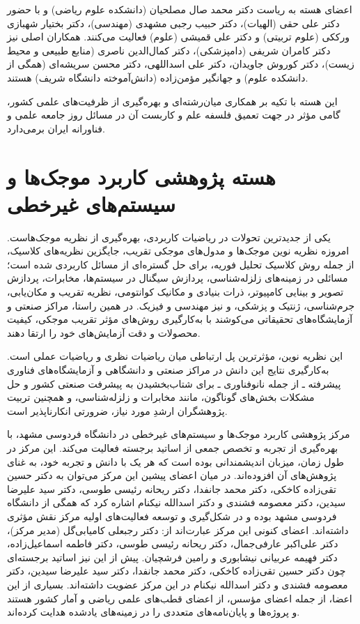 \documentclass[
  letterpaper,
  DIV=11,
  numbers=noendperiod]{scrreprt}
\begin{document}
اعضای هسته به ریاست دکتر محمد صال مصلحیان (دانشکده علوم ریاضی) و با حضور
دکتر علی حقی (الهیات)، دکتر حبیب رجبی مشهدی (مهندسی)، دکتر بختیار شهبازی
ورککی (علوم تربیتی) و دکتر علی قمیشی (علوم) فعالیت می‌کنند. همکاران اصلی
نیز دکتر کامران شریفی (دامپزشکی)، دکتر کمال‌الدین ناصری (منابع طبیعی و
محیط زیست)، دکتر کوروش جاویدان، دکتر علی اسداللهی، دکتر محسن سریشه‌ای
(همگی از دانشکده علوم) و جهانگیر مؤمن‌زاده (دانش‌آموخته دانشگاه شریف)
هستند.

این هسته با تکیه بر همکاری میان‌رشته‌ای و بهره‌گیری از ظرفیت‌های علمی کشور،
گامی مؤثر در جهت تعمیق فلسفه علم و کاربست آن در مسائل روز جامعه علمی و
فناورانه ایران برمی‌دارد.

\section{هسته پژوهشی کاربرد موجک‌ها و سیستم‌های
غیرخطی}\label{ux647ux633ux62aux647-ux67eux698ux648ux647ux634ux6cc-ux6a9ux627ux631ux628ux631ux62f-ux645ux648ux62cux6a9ux647ux627-ux648-ux633ux6ccux633ux62aux645ux647ux627ux6cc-ux63aux6ccux631ux62eux637ux6cc}

یکی از جدیدترین تحولات در ریاضیات کاربردی، بهره‌گیری از نظریه موجک‌هاست.
امروزه نظریه نوین موجک‌ها و مدول‌های موجکی تقریب، جایگزین نظریه‌های کلاسیک،
از جمله روش کلاسیک تحلیل فوریه، برای حل گستره‌ای از مسائل کاربردی شده
است؛ مسائلی در زمینه‌های زلزله‌شناسی، پردازش سیگنال در سیستم‌ها، مخابرات،
پردازش تصویر و بینایی کامپیوتر، ذرات بنیادی و مکانیک کوانتومی، نظریه
تقریب و مکان‌یابی، جرم‌شناسی، ژنتیک و پزشکی، و نیز مهندسی و فیزیک. در همین
راستا، مراکز صنعتی و آزمایشگاه‌های تحقیقاتی می‌کوشند با به‌کارگیری روش‌های
مؤثر تقریب موجکی، کیفیت محصولات و دقت آزمایش‌های خود را ارتقا دهند.

این نظریه نوین، مؤثرترین پل ارتباطی میان ریاضیات نظری و ریاضیات عملی
است. به‌کارگیری نتایج این دانش در مراکز صنعتی و دانشگاهی و آزمایشگاه‌های
فناوری پیشرفته ـ از جمله نانوفناوری ـ برای شتاب‌بخشیدن به پیشرفت صنعتی
کشور و حل مشکلات بخش‌های گوناگون، مانند مخابرات و زلزله‌شناسی، و همچنین
تربیت پژوهشگران ارشدِ مورد نیاز، ضرورتی انکارناپذیر است.

مرکز پژوهشی کاربرد موجک‌ها و سیستم‌های غیرخطی در دانشگاه فردوسی مشهد، با
بهره‌گیری از تجربه و تخصص جمعی از اساتید برجسته فعالیت می‌کند. این مرکز در
طول زمان، میزبان اندیشمندانی بوده است که هر یک با دانش و تجربه خود، به
غنای پژوهش‌های آن افزوده‌اند. در میان اعضای پیشین این مرکز می‌توان به دکتر
حسین تقی‌زاده کاخکی، دکتر محمد جانفدا، دکتر ریحانه رئیسی طوسی، دکتر سید
علیرضا سیدین، دکتر معصومه فشندی و دکتر اسدالله نیکنام اشاره کرد که همگی
از دانشگاه فردوسی مشهد بوده و در شکل‌گیری و توسعه فعالیت‌های اولیه مرکز
نقش مؤثری داشته‌اند. اعضای کنونی این مرکز عبارت‌اند از: دکتر رجبعلی
کامیابی‌گل (مدیر مرکز)، دکتر علی‌اکبر عارفی‌جمال، دکتر ریحانه رئیسی طوسی،
دکتر فاطمه اسماعیل‌زاده، دکتر فهیمه عربیانی نیشابوری و رامین فرشچیان. پیش
از این نیز اساتید برجسته‌ای چون دکتر حسین تقی‌زاده کاخکی، دکتر محمد
جانفدا، دکتر سید علیرضا سیدین، دکتر معصومه فشندی و دکتر اسدالله نیکنام
در این مرکز عضویت داشته‌اند. بسیاری از این اعضا، از جمله اعضای مؤسس، از
اعضای قطب‌های علمی ریاضی و آمار کشور هستند و پروژه‌ها و پایان‌نامه‌های
متعددی را در زمینه‌های یادشده هدایت کرده‌اند.
\end{document}
